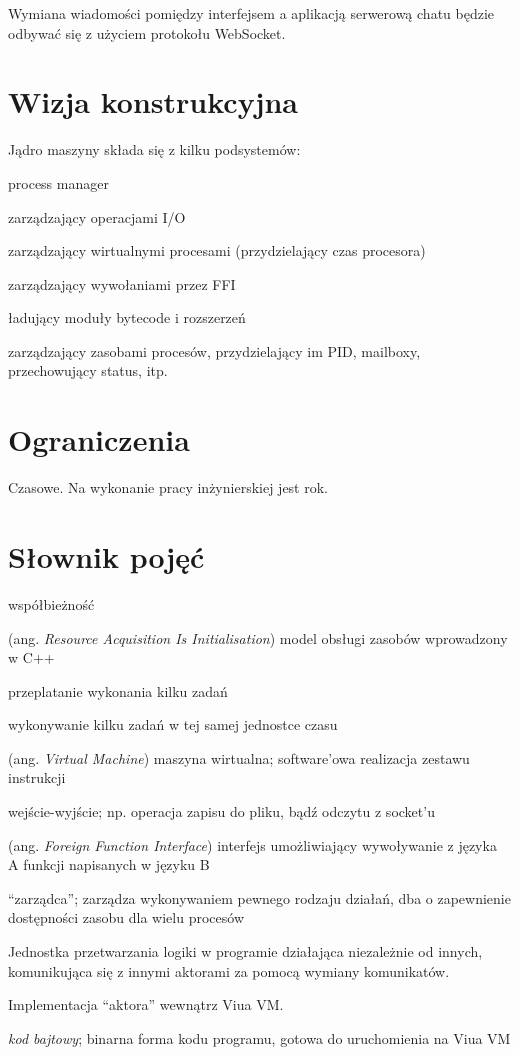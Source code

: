 \documentclass[11pt,oneside,a4paper,titlepage,onecolumn]{article}
\begin{document}
Wymiana wiadomości pomiędzy interfejsem a aplikacją serwerową chatu będzie odbywać się z użyciem protokołu WebSocket. 

\section{Wizja konstrukcyjna}

Jądro maszyny składa się z kilku podsystemów:

\begin{labeling}{process manager}
\item [scheduler IO] zarządzający operacjami I/O
\item [scheduler VP] zarządzający wirtualnymi procesami (przydzielający czas procesora)
\item [scheduler FFI] zarządzający wywołaniami przez FFI
\item [loader] ładujący moduły bytecode i rozszerzeń
\item [process manager] zarządzający zasobami procesów, przydzielający im PID, mailboxy, przechowujący status,
    itp.
\end{labeling}

\section{Ograniczenia}

Czasowe. Na wykonanie pracy inżynierskiej jest rok.

\newpage
\section{Słownik pojęć}

\begin{labeling}{współbieżność}
\item [RAII] (ang. \emph{Resource Acquisition Is Initialisation}) model obsługi zasobów wprowadzony w C++
\item [współbieżność] przeplatanie wykonania kilku zadań
\item [równoległość] wykonywanie kilku zadań w tej samej jednostce czasu
\item [VM] (ang. \emph{Virtual Machine}) maszyna wirtualna; software'owa realizacja zestawu instrukcji
\item [I/O] wejście-wyjście; np. operacja zapisu do pliku, bądź odczytu z socket'u
\item [FFI] (ang. \emph{Foreign Function Interface}) interfejs umożliwiający wywoływanie z języka A funkcji
    napisanych w języku B
\item [scheduler] ``zarządca''; zarządza wykonywaniem pewnego rodzaju działań, dba o zapewnienie dostępności
    zasobu dla wielu procesów
\item [aktor] Jednostka przetwarzania logiki w programie działająca niezależnie od innych, komunikująca się z
    innymi aktorami za pomocą wymiany komunikatów.
\item [proces] Implementacja ``aktora'' wewnątrz Viua VM.
\item[bytecode] \emph{kod bajtowy}; binarna forma kodu programu, gotowa do uruchomienia na Viua VM
\end{labeling}
\end{document}
